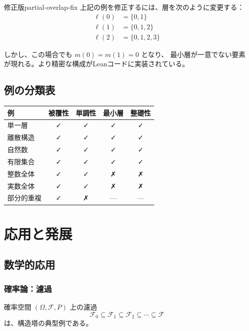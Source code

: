 \documentclass[a4paper,12pt]{ltjsarticle}
\begin{document}
\begin{remark}{修正版}{partial-overlap-fix}
上記の例を修正するには、層を次のように変更する：
\begin{align*}
\ell(0) &= \{0, 1\} \\
\ell(1) &= \{0, 1, 2\} \\
\ell(2) &= \{0, 1, 2, 3\}
\end{align*}

しかし、この場合でも $m(0) = m(1) = 0$ となり、
最小層が一意でない要素が現れる。より精密な構成がLeanコードに実装されている。
\end{remark}

\subsection{例の分類表}

\begin{center}
\begin{tabular}{|l|c|c|c|c|}
\hline
\textbf{例} & \textbf{被覆性} & \textbf{単調性} & \textbf{最小層} & \textbf{整礎性} \\
\hline
単一層 & ✓ & ✓ & ✓ & ✓ \\
離散構造 & ✓ & ✓ & ✓ & ✓ \\
自然数 & ✓ & ✓ & ✓ & ✓ \\
有限集合 & ✓ & ✓ & ✓ & ✓ \\
整数全体 & ✓ & ✓ & ✗ & ✗ \\
実数全体 & ✓ & ✓ & ✗ & ✗ \\
部分的重複 & ✓ & ✗ & — & — \\
\hline
\end{tabular}
\end{center}

\section{応用と発展}

\subsection{数学的応用}

\subsubsection{確率論：濾過}

確率空間 $(\Omega, \mathcal{F}, P)$ 上の濾過
\[\mathcal{F}_0 \subseteq \mathcal{F}_1 \subseteq \mathcal{F}_2 \subseteq \cdots \subseteq \mathcal{F}\]
は、構造塔の典型例である。
\end{document}
